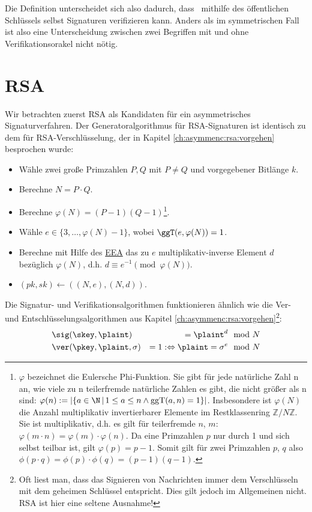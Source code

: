 Die Definition unterscheidet sich also dadurch, dass
\A~mithilfe des öffentlichen Schlüssels selbst Signaturen verifizieren kann. Anders
als im symmetrischen Fall ist also eine Unterscheidung zwischen zwei
Begriffen mit und ohne Verifikationsorakel nicht nötig. 

\section{RSA}
Wir betrachten zuerst RSA als Kandidaten für ein asymmetrisches
Signaturverfahren. Der Generatoralgorithmus für RSA-Signaturen ist
identisch zu dem für RSA-Verschlüsselung, der in Kapitel
\ref{ch:asymmenc:rsa:vorgehen} besprochen wurde:
\begin{itemize}
 	\item Wähle zwei große Primzahlen $P, Q$ mit $P \neq Q$ und vorgegebener Bitlänge $k$.
 	\item Berechne $N = P \cdot Q$.
 	\item Berechne $\varphi(N) = (P - 1)(Q - 1)$\footnote{$\varphi$
            bezeichnet die Eulersche Phi-Funktion. Sie gibt für jede
            natürliche Zahl n an, wie viele zu n teilerfremde natürliche
            Zahlen es gibt, die nicht größer als n sind: 
            $\varphi(n) := \vert \{a\in\N \, |\, 1 \le a \le n
            \land \operatorname{ggT}(a,n) = 1 \} \vert$. Insbesondere
            ist $\varphi(N)$ die Anzahl multiplikativ invertierbarer
            Elemente im Restklassenring $\mathbb{Z}/N\mathbb{Z}$.
            Sie ist multiplikativ, d.h. es gilt für teilerfremde $n$, $m$:
            $\varphi(m\cdot n) = \varphi(m) \cdot \varphi(n)$. Da eine
            Primzahlen $p$ nur durch 1 und sich selbst teilbar ist, 
            gilt $\varphi(p) = p-1$. Somit gilt für zwei Primzahlen $p$,
            $q$ also $\phi(p \cdot q) = \phi(p) \cdot \phi(q) = (p-1)(q-1)$.}.
 	\item Wähle $e \in \{3, \dotsc, \varphi(N) - 1\}$, wobei
          $\ggT(e, \varphi(N)) = 1$. 
 	\item Berechne mit Hilfe des \hyperref[ssec:eea]{EEA} das zu $e$
          multiplikativ-inverse Element $d$ bezüglich $\varphi(N)$,
          d.h. $d \equiv e^{-1} \pmod{\varphi(N)}$.
        \item $(pk, sk)\leftarrow ((N,e), (N,d))$.
\end{itemize}
Die Signatur- und Verifikationsalgorithmen funktionieren ähnlich wie die
Ver- und Entschlüsselungsalgorithmen aus Kapitel \ref{ch:asymmenc:rsa:vorgehen}\footnote{Oft liest man, dass das Signieren
  von Nachrichten immer dem Verschlüsseln mit dem geheimen Schlüssel
  entspricht. Dies gilt jedoch im Allgemeinen nicht. RSA ist hier eine
  seltene Ausnahme!}:
\begin{alignat*}{3}
& \sig(\skey, \plaint) & = \plaint^d & \mod N\\
& \ver(\pkey, \plaint, \sigma) & = 1 : \Leftrightarrow \plaint = \sigma^e & \mod N 
\end{alignat*}


